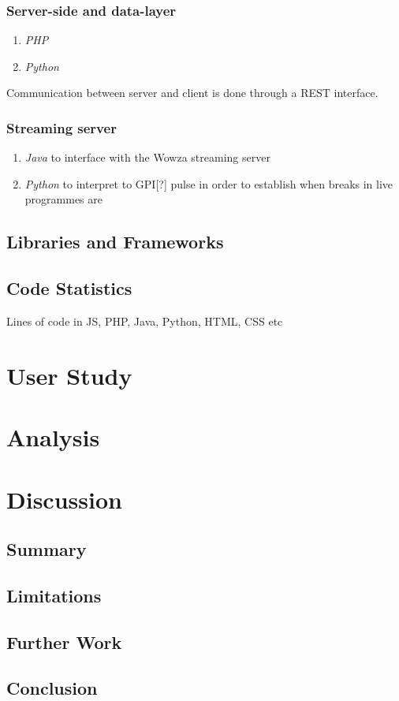 \documentclass[12pt,a4paper,twoside, titlepage, openright, cleardoublepage=empty]{article}
\begin{document}
\subsubsection{Server-side and data-layer}
\begin{enumerate}
\item \textit{PHP}
\item \textit{Python}
\end{enumerate}

Communication between server and client is done through a REST interface.

\subsubsection{Streaming server}
\begin{enumerate}
\item \textit{Java} to interface with the Wowza streaming server
\item \textit{Python} to interpret to GPI[?] pulse in order to establish when breaks in live programmes are
\end{enumerate}

\subsection{Libraries and Frameworks}

\subsection{Code Statistics}
Lines of code in JS, PHP, Java, Python, HTML, CSS etc

\cleardoublepage

\section{User Study}

\cleardoublepage

\section{Analysis}

\cleardoublepage

\section{Discussion}
\subsection{Summary}
\subsection{Limitations}
\subsection{Further Work}
\subsection{Conclusion}
\end{document}
